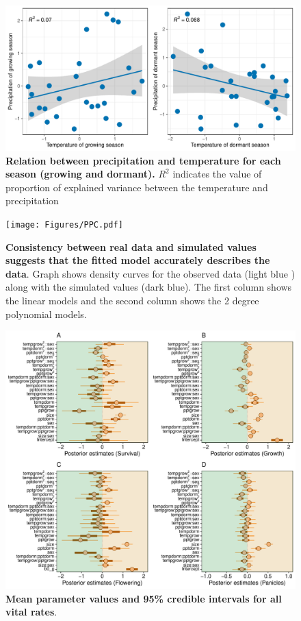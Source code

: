 \documentclass[12pt]{article}
\begin{document}
\begin{figure}[h!]
		\centering
		\includegraphics[width=0.95\linewidth]{Figures/Varianceexplained.pdf}
		\caption{\textbf{Relation between precipitation and temperature for each season (growing and dormant).} $R^2$ indicates the value of proportion of explained variance between the temperature and precipitation}
		\label{Sup:Correlation}
\end{figure}
	
  \begin{figure}[h!]
		\centering
		\texttt{[image: Figures/PPC.pdf]}
		\caption{\textbf{Consistency between real data and simulated values suggests that the fitted model accurately describes the data}. Graph shows density curves for the observed data (light blue ) along with the simulated values (dark blue). The first column shows the linear models and the second column shows the 2 degree polynomial models.}
		\label{Sup:PPC}
	\end{figure}
	
	\begin{figure}[h!]
		\centering
		\includegraphics[width=0.95\linewidth]{Figures/Posterior_mean.pdf}
		\caption{\textbf{Mean parameter values and 95\% credible intervals for all vital rates}. }
		\label{Sup:Posterior}
	\end{figure}
	
\end{document}
